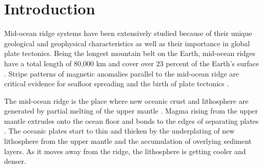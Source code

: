 \documentclass[letterpaper,12pt,notitle]{memphisthesis}                     %
\begin{document}
\newpage



\begin{singlespace}
	\listoffigures
\end{singlespace}

\newpage


\chapter{Introduction}
\setcounter{section}{0}
\setcounter{subsection}{0}

Mid-ocean ridge systems have been extensively studied because of their unique geological and geophysical characteristics as well as their importance in global plate tectonics. Being the longest mountain belt on the Earth, mid-ocean ridges have a total length of 80,000 km and cover over 23 percent of the Earth’s surface \citep{Peltier1989}. Stripe patterns of magnetic anomalies parallel to the mid-ocean ridge are critical evidence for seafloor spreading and the birth of plate tectonics \citep{Hess1964}.

The mid-ocean ridge is the place where new oceanic crust and lithosphere are generated by partial melting of the upper mantle \citep{Cann1968}. Magma rising from the upper mantle extrudes onto the ocean floor and bonds to the edges of separating plates \citep{Chen1992}. The oceanic plates start to thin and thicken by the underplating of new lithosphere from the upper mantle and the accumulation of overlying sediment layers. As it moves away from the ridge, the lithosphere is getting cooler and denser.
\end{document}
